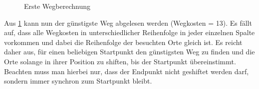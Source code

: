 \begin{figure}[H]
	\centering
	
	\caption{Erste Wegberechnung
		\label{fig:erste-wegberechnung}}
\end{figure}


Aus \cref{fig:erste-wegberechnung} kann nun der günstigste Weg abgelesen werden (Wegkosten = 13). Es fällt auf, dass alle Wegkosten in unterschiedlicher Reihenfolge in jeder einzelnen Spalte vorkommen und dabei die Reihenfolge der besuchten Orte gleich ist. Es reicht daher aus, für einen beliebigen Startpunkt den günstigsten Weg zu finden und die Orte solange in ihrer Position zu shiften, bis der Startpunkt übereinstimmt. Beachten muss man hierbei nur, dass der Endpunkt nicht geshiftet werden darf, sondern immer synchron zum Startpunkt bleibt.

